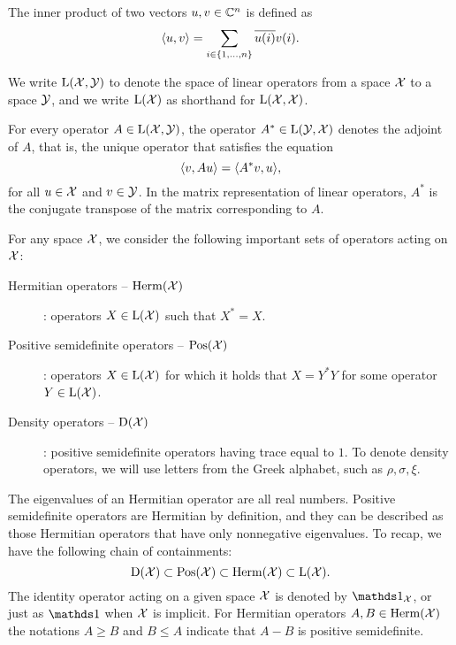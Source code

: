 The inner product of two vectors $u, v \in \mathbb{C}^{n}$ is defined as
\begin{equation}
  \langle u , v\rangle = \sum_{i\in\{1,\ldots,n\}}\overline{u(i)}v(i).
\end{equation}

We write $\mathrm{L}(\mathcal{X},\mathcal{Y})$ to denote the space of linear operators from a space $\mathcal{X}$ 
to a space $\mathcal{Y}$, and we write $\mathrm{L}(\mathcal{X})$ as shorthand for $\mathrm{L}(\mathcal{X},\mathcal{X})$.

For every operator $A\in\mathrm{L}(\mathcal{X},\mathcal{Y})$, the operator $A^{\ast}\in\mathrm{L}(\mathcal{Y},\mathcal{X})$
denotes the adjoint of $A$, that is, the unique operator that satisfies the equation
\begin{equation}
  \langle v , Au\rangle = \langle A^{\ast}v , u\rangle,
\end{equation}
for all $u\in\mathcal{X}$ and $v\in\mathcal{Y}$.
In the matrix representation of linear operators, $A^{\ast}$ is the conjugate transpose of 
the matrix corresponding to $A$.

\renewcommand{\descriptionlabel}[1]{\hspace{\labelsep}\emph{#1}}

For any space $\mathcal{X}$, we consider the following important sets of operators acting on $\mathcal{X}$:
\begin{description}
\item[Hermitian operators -- $\mathrm{Herm}(\mathcal{X})$]: operators $X\in\mathrm{L}(\mathcal{X})$ such that $X^{\ast} = X$.
\item[Positive semidefinite operators -- $\mathrm{Pos}(\mathcal{X})$]: operators $X\in\mathrm{L}(\mathcal{X})$ for which it holds 
  that $X = Y^{\ast}Y$ for some operator $Y\in\mathrm{L}(\mathcal{X})$.
\item[Density operators -- $\mathrm{D}(\mathcal{X})$]: positive semidefinite operators
  having trace equal to $1$. To denote density operators, we will use letters from 
  the Greek alphabet, such as $\rho,\sigma,\xi$.
\end{description}
The eigenvalues of an Hermitian operator are all real numbers. 
Positive semidefinite operators are Hermitian by definition, and they can be
described as those Hermitian operators that have only nonnegative eigenvalues.
To recap, we have the following chain of containments:
\begin{equation}
  \mathrm{D}(\mathcal{X}) \subset \mathrm{Pos}(\mathcal{X}) \subset \mathrm{Herm}(\mathcal{X}) \subset \mathrm{L}(\mathcal{X}).
\end{equation}
The identity operator acting on a given space $\mathcal{X}$ is denoted by $\I_{\X}$, 
or just as $\I$ when $\mathcal{X}$ is implicit.
For Hermitian operators $A, B \in \mathrm{Herm}(\mathcal{X})$ the notations $A\geq B$ 
and $B \leq A$ indicate that $A - B$ is positive semidefinite.

